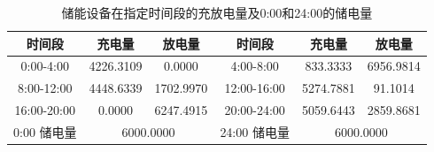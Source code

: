 \begin{table}[htbp]
\centering
\caption{储能设备在指定时间段的充放电量及0:00和24:00的储电量}\label{tab:q1-storage}
\normalsize\setlength{\tabcolsep}{5pt}
\begin{tabular}{@{}cccccc@{}}
\toprule
时间段 & 充电量 & 放电量 & 时间段 & 充电量 & 放电量 \\
\midrule
0:00-4:00 & 4226.3109 & 0.0000 & 4:00-8:00 & 833.3333 & 6956.9814 \\
8:00-12:00 & 4448.6339 & 1702.9970 & 12:00-16:00 & 5274.7881 & 91.1014 \\
16:00-20:00 & 0.0000 & 6247.4915 & 20:00-24:00 & 5059.6443 & 2859.8681 \\
0:00 储电量 & \multicolumn{2}{c}{6000.0000} & 24:00 储电量 & \multicolumn{2}{c}{6000.0000} \\
\bottomrule
\end{tabular}
\end{table}
